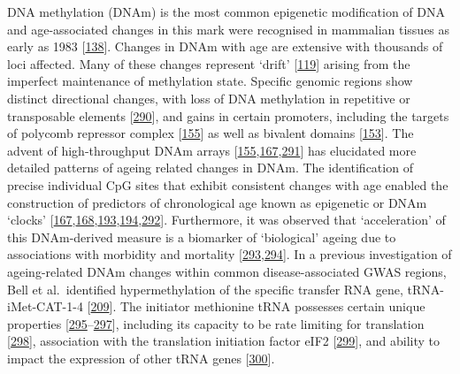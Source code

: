 \documentclass[
]{book}
\begin{document}
DNA methylation (DNAm) is the most common epigenetic modification of DNA and age-associated changes in this mark were recognised in mammalian tissues as early as 1983 {[}\protect\hyperlink{ref-Wilson1983}{138}{]}.
Changes in DNAm with age are extensive with thousands of loci affected.
Many of these changes represent `drift' {[}\protect\hyperlink{ref-Fraga2005}{119}{]} arising from the imperfect maintenance of methylation state.
Specific genomic regions show distinct directional changes, with loss of DNA methylation in repetitive or transposable elements {[}\protect\hyperlink{ref-Chuong2017}{290}{]}, and gains in certain promoters, including the targets of polycomb repressor complex {[}\protect\hyperlink{ref-Teschendorff2010}{155}{]} as well as bivalent domains {[}\protect\hyperlink{ref-Rakyan2010}{153}{]}.
The advent of high-throughput DNAm arrays {[}\protect\hyperlink{ref-Teschendorff2010}{155},\protect\hyperlink{ref-Hannum2013}{167},\protect\hyperlink{ref-Sandoval2011}{291}{]} has elucidated more detailed patterns of ageing related changes in DNAm.
The identification of precise individual CpG sites that exhibit consistent changes with age enabled the construction of predictors of chronological age known as epigenetic or DNAm `clocks' {[}\protect\hyperlink{ref-Hannum2013}{167},\protect\hyperlink{ref-Horvath2013}{168},\protect\hyperlink{ref-Levine2018}{193},\protect\hyperlink{ref-Lu2019}{194},\protect\hyperlink{ref-Horvath2018a}{292}{]}.
Furthermore, it was observed that `acceleration' of this DNAm-derived measure is a biomarker of `biological' ageing due to associations with morbidity and mortality {[}\protect\hyperlink{ref-Horvath2018}{293},\protect\hyperlink{ref-Field2018}{294}{]}.
In a previous investigation of ageing-related DNAm changes within common disease-associated GWAS regions, Bell et al.~identified hypermethylation of the specific transfer RNA gene, tRNA-iMet-CAT-1-4 {[}\protect\hyperlink{ref-Bell2016}{209}{]}.
The initiator methionine tRNA possesses certain unique properties {[}\protect\hyperlink{ref-Bhattacharyya2016}{295}--\protect\hyperlink{ref-Birch2016}{297}{]}, including its capacity to be rate limiting for translation {[}\protect\hyperlink{ref-Rideout2012}{298}{]}, association with the translation initiation factor eIF2 {[}\protect\hyperlink{ref-Kolitz2010}{299}{]}, and ability to impact the expression of other tRNA genes {[}\protect\hyperlink{ref-Pavon-Eternod2013}{300}{]}.
\end{document}
